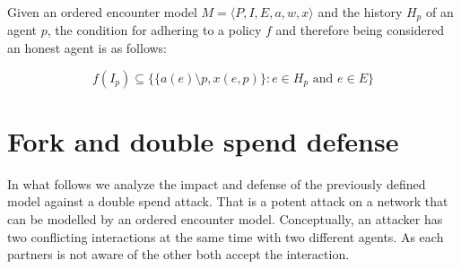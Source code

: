 \begin{defn}
    Given an ordered encounter model $M = \langle P, I, E, a, w, x \rangle$ and the history $H_p$ of an
    agent $p$, the condition for adhering to a policy $f$ and
    therefore being considered an honest agent is as follows: 

    \begin{equation}
        f(I_p) \subseteq \{ \{a(e) \setminus p, x(e, p)\} : e \in H_p \text{ and } e \in E\}
    \end{equation}
\end{defn}






\section{Fork and double spend defense}
In what follows we analyze the impact and defense of the previously defined model against a double spend attack. That is a potent 
attack on a network that can be modelled by an ordered encounter model. Conceptually, an attacker 
has two conflicting interactions at the same time with two different agents. As each partners is not
aware of the other both accept the interaction. 


